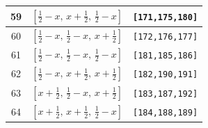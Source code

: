 \documentclass[fleqn,8pt]{jsarticle}
\begin{document}
\begin{longtable}{ccc}
59 & $\left[ \frac{1}{2} - x,\, x + \frac{1}{2},\, \frac{1}{2} - x \right]$ & {\tt [171,175,180]} \\ \hline
60 & $\left[ \frac{1}{2} - x,\, \frac{1}{2} - x,\, x + \frac{1}{2} \right]$ & {\tt [172,176,177]} \\ \hline
61 & $\left[ \frac{1}{2} - x,\, \frac{1}{2} - x,\, \frac{1}{2} - x \right]$ & {\tt [181,185,186]} \\ \hline
62 & $\left[ \frac{1}{2} - x,\, x + \frac{1}{2},\, x + \frac{1}{2} \right]$ & {\tt [182,190,191]} \\ \hline
63 & $\left[ x + \frac{1}{2},\, \frac{1}{2} - x,\, x + \frac{1}{2} \right]$ & {\tt [183,187,192]} \\ \hline
64 & $\left[ x + \frac{1}{2},\, x + \frac{1}{2},\, \frac{1}{2} - x \right]$ & {\tt [184,188,189]} \\
\end{longtable}
\renewcommand{\arraystretch}{1.2}
\end{document}
